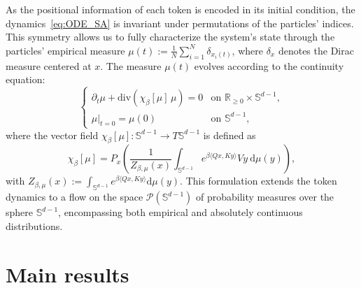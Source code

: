 \documentclass{article}
\numberwithin{theorem}{section}
\begin{document}
As the positional information of each token is encoded in its initial condition, the dynamics~\eqref{eq:ODE_SA} is invariant under permutations of the particles' indices. This symmetry allows us to fully characterize the system's state through the particles' empirical measure $\mu(t) := \frac{1}{N}\sum_{i=1}^N\delta_{x_i(t)}$, where $\delta_x$ denotes the Dirac measure centered at $x$. The measure $\mu(t)$ evolves according to the continuity equation:
\begin{equation}
\label{eq:cont_pde}
\begin{cases}
\partial_t \mu + \mathrm{div}(\chi_\beta[\mu]\, \mu) = 0 & \text{on } \mathbb{R}_{\geq 0} \times \mathbb{S}^{d-1},\\
\mu|_{t=0} = \mu(0) & \text{on } \mathbb{S}^{d-1},
\end{cases}
\end{equation}
where the vector field $\chi_\beta[\mu]: \mathbb{S}^{d-1} \to T\mathbb{S}^{d-1}$ is defined as
\begin{equation}
\label{eq:chi_SA}
\chi_\beta[\mu] = P_x\left(\frac{1}{Z_{\beta, \mu}(x)} \int_{\mathbb{S}^{d-1}} e^{\beta\langle Qx, Ky\rangle} V y \ \mathrm{d}\mu(y)\right),
\end{equation}
with $Z_{\beta, \mu}(x) := \int_{\mathbb{S}^{d-1}} e^{\beta\langle Qx, Ky\rangle}  \mathrm{d}\mu(y)$.
This formulation extends the token dynamics to a flow on the space $\mathcal P(\mathbb{S}^{d-1})$ of probability measures over the sphere $\mathbb{S}^{d-1}$, encompassing both empirical and absolutely continuous distributions.

\section{Main results}
\end{document}
